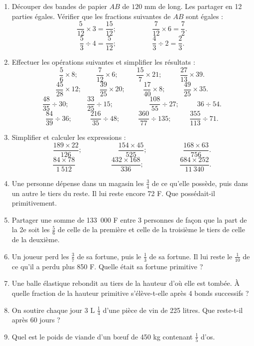 \documentclass[12 pt]{report}
\theoremstyle{plain}
\newcounter{n}
\begin{document}
 \begin{enumerate}
 \item Découper des bandes de papier $AB$ de $120$ mm de long. Les partager en 12 parties égales. Vérifier 
 que les fractions suivantes de $AB$ sont égales : 
 \[ \frac5{12}\times 3 = \frac{15}{12}; \phantom{meow}\phantom{meow}\frac7{12}\times 6 = \frac72. \]
 \[ \frac53\div4=\frac5{12}; \phantom{meow}\phantom{meow}\frac43\div2=\frac23.\]
\item Effectuer les opérations suivantes et simplifier les résultats : 
\[ \frac56\times 8 ; \phantom{meow} \frac7{12}\times6; 
\phantom{meow}\frac{15}7\times21; \phantom{meow}
\frac{27}{13}\times 39.\] 
\[ \frac{45}{28} \times 12; \phantom{meow} \frac{39}{25} \times 20; \phantom{meow} 
\frac{17}{40}\times 8;\phantom{meow} \frac{49}{25}\times35 .\]
\[\frac{48}{35}\div30; \phantom{meow} \frac{33}{25}\div 15 ; \phantom{meow}\phantom{meow}
\frac{108}{55}\div 27 ; \phantom{meow} 
36 \div 54. \]
\[ \frac{84}{39}\div 36; \phantom{meow}
\frac{216}{35}\div 48 ; \phantom{meow}
\frac{360}{77}\div 135; \phantom{meow}
\frac{355}{113}\div 71.\]
\item Simplifier et calculer les expressions : 
\[ \frac{189\times 22}{126}; \phantom{meow}\phantom{meow} \frac{154\times 45}{525} ; \phantom{meow}\phantom{meow} \frac{168\times 63}{756}.\]
\[\frac{84\times 78}{1~512}\phantom{meow}\phantom{meow} \frac{432\times 168}{336} ; 
\phantom{meow}\phantom{meow} \frac{684\times 252}{11~340}.\]
\item Une personne dépense dans un magasin les $\frac34$ de ce qu'elle possède, puis dans un autre le tiers du reste. Il lui reste encore 72 F. Que possédait-il primitivement.
\item Partager une somme de 133~000 F entre 3 personnes de façon que la part de la 2e soit les $\frac56$ de celle de la première et celle de la troisième le tiers de celle de la deuxième. 
\item Un joueur perd les $\frac37$ de sa fortune, puis le $\frac13$ de sa fortune. Il lui reste le $\frac1{10}$ de ce qu'il a perdu plus 850 F. Quelle était sa fortune primitive ? 
\item Une balle élastique rebondit au tiers de la hauteur d'où elle est tombée. À quelle fraction de la hauteur primitive s'élève-t-elle après 4 bonds successifs ? 
\item On soutire chaque jour 3 L $\frac14$ d'une pièce de vin de 225 litres. Que reste-t-il après 60 jours ?
\item Quel est le poids de viande d'un bœuf de 450 kg contenant $\frac15$ d'os. 

\end{enumerate}
\end{document}
